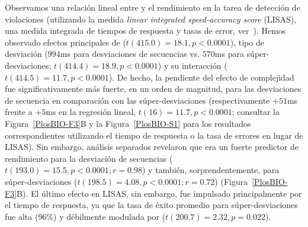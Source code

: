 
Observamos una relación lineal entre \mdlbin y el rendimiento en la tarea de detección de violaciones (utilizando la medida \textit{linear integrated speed-accuracy score} (LISAS), una medida integrada de tiempos de respuesta y tasas de error, ver~\cite{f87,f88}). Hemos observado efectos principales de \mdlbin ($t(415.0) = 18.1, p <0.0001$), tipo de desviación ($994$ms para desviaciones de secuencias vs. $570$ms para súper-desviaciones; $t (414.4) = 18.9, p < 0.0001$) y su interacción ($t(414.5) = 11.7, p < 0.0001$). De hecho, la pendiente del efecto de complejidad fue significativamente más fuerte, en un orden de magnitud, para las desviaciones de secuencia en comparación con las súper-desviaciones (respectivamente $+51$ms frente a $+5$ms en la regresión lineal, $t(16) = 11.7, p < 0.0001$; consultar la Figura~\ref{PlosBIO-F3}B y la Figura~\ref{PlosBIO-S1} para los resultados correspondientes utilizando el tiempo de respuesta o la tasa de errores en lugar de LISAS). Sin embargo, análisis separados revelaron que \mdlbin era un fuerte predictor de rendimiento para la desviación de secuencias ($t(193.0) = 15.5, p < 0.0001; r = 0.98$) y también, sorprendentemente, para súper-desviaciones ($t (198.5) = 4.08, p < 0.0001; r = 0.72$) (Figura~\ref{PlosBIO-F3}B). El último efecto en LISAS, sin embargo, fue impulsado principalmente por el tiempo de respuesta, ya que la tasa de éxito promedio para súper-desviaciones fue alta (96\%) y débilmente modulada por \mdlbin ($t(200.7) = 2.32, p = 0.022$).

